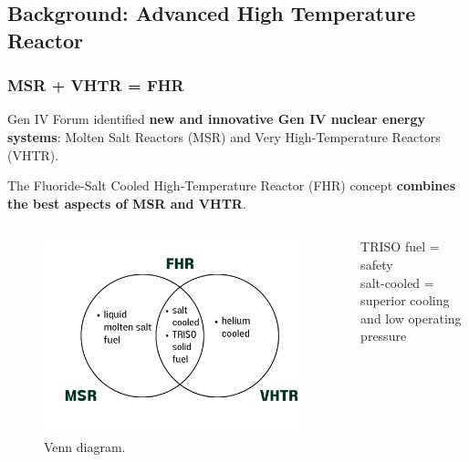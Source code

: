 \subsection{Background: Advanced High Temperature Reactor}
    \begin{frame}
        \frametitle{MSR + VHTR = FHR}
        Gen IV Forum identified \textbf{new and innovative Gen IV nuclear energy systems}: 
        Molten Salt Reactors (MSR) and Very High-Temperature Reactors (VHTR). 
        
        \vspace{0.2cm}
        The Fluoride-Salt Cooled High-Temperature Reactor (FHR) concept \textbf{combines 
        the best aspects of MSR and VHTR}.
        \vspace{-0.2cm}
        \begin{columns}
        \begin{column}{0.7\textwidth}
        \begin{figure}[]
            \centering
            \includegraphics[width=\linewidth]{figures/fhr_venn.png} 
            \caption{Venn diagram.}
        \end{figure}
        \end{column}
        \begin{column}{0.3\textwidth}
            TRISO fuel = safety
            \\
            salt-cooled = superior cooling and low operating pressure 
        \end{column}
    \end{columns}
        \end{frame}

